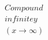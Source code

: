 \documentclass[preview]{standalone}
\begin{document}
\begin{align*}
Compound\\infinitey\\(x\to \infty)
\end{align*}
\end{document}
